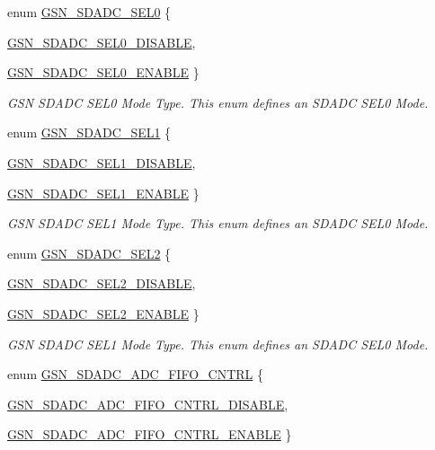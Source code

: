 \begin{DoxyCompactItemize}
enum \hyperlink{a00652_ga033785abce307d457533dfa53b59d84b}{GSN\_\-SDADC\_\-SEL0} \{ \par
\hyperlink{a00652_gga033785abce307d457533dfa53b59d84ba006fec0175e4c4c1bbcde3cd74bb0161}{GSN\_\-SDADC\_\-SEL0\_\-DISABLE}, 
\par
\hyperlink{a00652_gga033785abce307d457533dfa53b59d84bac95845a9bd57c4289957cb48b8c28373}{GSN\_\-SDADC\_\-SEL0\_\-ENABLE}
 \}
\begin{DoxyCompactList}\small\item\em GSN SDADC SEL0 Mode Type. This enum defines an SDADC SEL0 Mode. \end{DoxyCompactList}\item 
enum \hyperlink{a00652_ga7881f6f750388de2816384904fafac2a}{GSN\_\-SDADC\_\-SEL1} \{ \par
\hyperlink{a00652_gga7881f6f750388de2816384904fafac2aad040e5a10609b72d15f3f4ced9e108e1}{GSN\_\-SDADC\_\-SEL1\_\-DISABLE}, 
\par
\hyperlink{a00652_gga7881f6f750388de2816384904fafac2aa565a0e3706cba84eecf3e5beab847e22}{GSN\_\-SDADC\_\-SEL1\_\-ENABLE}
 \}
\begin{DoxyCompactList}\small\item\em GSN SDADC SEL1 Mode Type. This enum defines an SDADC SEL0 Mode. \end{DoxyCompactList}\item 
enum \hyperlink{a00652_gad596a4cc54081bcce130d18d07fd701a}{GSN\_\-SDADC\_\-SEL2} \{ \par
\hyperlink{a00652_ggad596a4cc54081bcce130d18d07fd701aa441f0c848f12eda7c5bc0d04f5a831c2}{GSN\_\-SDADC\_\-SEL2\_\-DISABLE}, 
\par
\hyperlink{a00652_ggad596a4cc54081bcce130d18d07fd701aa0e791e446dbe8195d30bca0683096adf}{GSN\_\-SDADC\_\-SEL2\_\-ENABLE}
 \}
\begin{DoxyCompactList}\small\item\em GSN SDADC SEL1 Mode Type. This enum defines an SDADC SEL0 Mode. \end{DoxyCompactList}\item 
enum \hyperlink{a00652_ga2935ec509d4dbac8b79ee30623d4c11f}{GSN\_\-SDADC\_\-ADC\_\-FIFO\_\-CNTRL} \{ \par
\hyperlink{a00652_gga2935ec509d4dbac8b79ee30623d4c11fa23331713502922b9d65fff5fb5ff0609}{GSN\_\-SDADC\_\-ADC\_\-FIFO\_\-CNTRL\_\-DISABLE}, 
\par
\hyperlink{a00652_gga2935ec509d4dbac8b79ee30623d4c11fa415e5569f69e30fa01e3ecfc0ef4bf32}{GSN\_\-SDADC\_\-ADC\_\-FIFO\_\-CNTRL\_\-ENABLE}
 \}

\end{DoxyCompactItemize}
